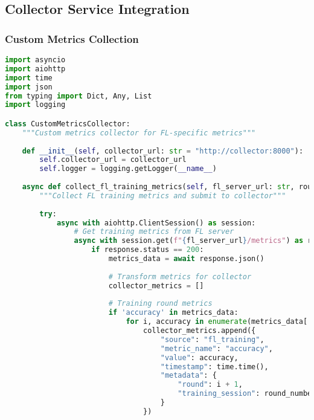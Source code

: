 \subsection{Collector Service Integration}

\subsubsection{Custom Metrics Collection}

\begin{lstlisting}[language=python, caption=Custom Metrics Collector]
import asyncio
import aiohttp
import time
import json
from typing import Dict, Any, List
import logging

class CustomMetricsCollector:
    """Custom metrics collector for FL-specific metrics"""
    
    def __init__(self, collector_url: str = "http://collector:8000"):
        self.collector_url = collector_url
        self.logger = logging.getLogger(__name__)
    
    async def collect_fl_training_metrics(self, fl_server_url: str, round_number: int):
        """Collect FL training metrics and submit to collector"""
        
        try:
            async with aiohttp.ClientSession() as session:
                # Get training metrics from FL server
                async with session.get(f"{fl_server_url}/metrics") as response:
                    if response.status == 200:
                        metrics_data = await response.json()
                        
                        # Transform metrics for collector
                        collector_metrics = []
                        
                        # Training round metrics
                        if 'accuracy' in metrics_data:
                            for i, accuracy in enumerate(metrics_data['accuracy']):
                                collector_metrics.append({
                                    "source": "fl_training",
                                    "metric_name": "accuracy",
                                    "value": accuracy,
                                    "timestamp": time.time(),
                                    "metadata": {
                                        "round": i + 1,
                                        "training_session": round_number
                                    }
                                })
                        

\end{lstlisting}
